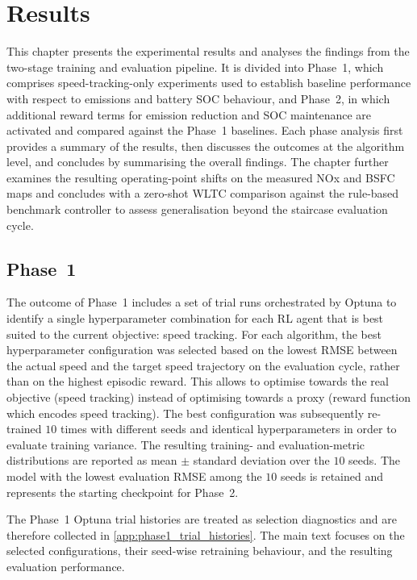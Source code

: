 \chapter{Results}
\label{chap:results}
This chapter presents the experimental results and analyses the findings from the two-stage training and evaluation pipeline. It is divided into Phase~1, which comprises speed-tracking-only experiments used to establish baseline performance with respect to emissions and battery \ac{SOC} behaviour, and Phase~2, in which additional reward terms for emission reduction and \ac{SOC} maintenance are activated and compared against the Phase~1 baselines. Each phase analysis first provides a summary of the results, then discusses the outcomes at the algorithm level, and concludes by summarising the overall findings. The chapter further examines the resulting operating-point shifts on the measured \ac{NOx} and \ac{BSFC} maps and concludes with a zero-shot \ac{WLTC} comparison against the rule-based benchmark controller to assess generalisation beyond the staircase evaluation cycle.

\section{Phase~1}
\label{sec:results_phase1}
The outcome of Phase~1 includes a set of trial runs orchestrated by Optuna to identify a single hyperparameter combination for each \ac{RL} agent that is best suited to the current objective: speed tracking. For each algorithm, the best hyperparameter configuration was selected based on the lowest \ac{RMSE} between the actual speed and the target speed trajectory on the evaluation cycle, rather than on the highest episodic reward. This allows to optimise towards the real objective (speed tracking) instead of optimising towards a proxy (reward function which encodes speed tracking). The best configuration was subsequently re-trained $10$ times with different seeds and identical hyperparameters in order to evaluate training variance. The resulting training- and evaluation-metric distributions are reported as mean $\pm$ standard deviation over the $10$ seeds. The model with the lowest evaluation \ac{RMSE} among the $10$ seeds is retained and represents the starting checkpoint for Phase~2.

The Phase~1 Optuna trial histories are treated as selection diagnostics and are therefore collected in \autoref{app:phase1_trial_histories}. The main text focuses on the selected configurations, their seed-wise retraining behaviour, and the resulting evaluation performance.

